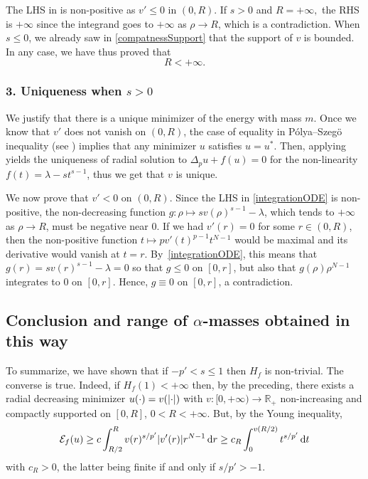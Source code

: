 \documentclass[JEP,XML,SOM,Unicode,published]{cedram}
\theoremstyle{plain}
\theoremstyle{definition}
\newcommand{\dd}{\mathop{}\mathopen{}\mathrm{d}}
\newcommand{\R}{\mathbb{R}}
\newcommand{\ener}{\mathcal{E}}
\DeclarePairedDelimiter{\abs}{\lvert}{\rvert}
\begin{document}
The LHS in  is non-positive as $v'\leq 0$ in $(0,R)$. If $s > 0$ and $R=+\infty,$ the RHS is $+\infty$ since the integrand goes to $+\infty$ as $\rho\to R$, which is a contradiction. When $s\leq 0$, we already saw in \eqref{compatnessSupport} that the support of $v$ is bounded. In any case, we have thus proved that\vspace*{-3pt}
\[
R<+\infty.
\]

\subsubsection*{\textup{3}. Uniqueness when $s>0$} We justify that there is a unique minimizer of the energy with mass $m$. Once we know that $v'$ does not vanish on $(0,R)$, the case of equality in Pólya–Szegö inequality (see \cite[Th.\,1.1]{brothersMinimalRearrangementsSobolev1988}) implies that any minimizer $u$ satisfies $u=u^*$. Then, applying \cite[Th.\,1]{serrinUniquenessGroundStates2000} yields the uniqueness of radial solution to $\Delta_p u+f(u)=0$ for the non-linearity $f(t)=\lambda-st^{s-1}$, thus we get that $v$ is unique.

We now prove that $v'<0$ on $(0,R)$. Since the LHS in \eqref{integrationODE} is non-positive, the non-decreasing function $g:\rho\mapsto sv(\rho)^{s-1}-\lambda$, which tends to $+\infty$ as $\rho\to R$, must be negative near $0$. If we had $v'(r)=0$ for some $r\in(0,R)$, then the non-positive function $t\mapsto pv'(t)^{p-1}t^{N-1}$ would be maximal and its derivative would vanish at $t=r$. By~\eqref{integrationODE}, this means that $g(r)=sv(r)^{s-1}-\lambda=0$ so that $g\leq 0$ on $[0,r]$, but also that $g(\rho)\rho^{N-1}$ integrates to $0$ on $[0,r]$. Hence, $g\equiv 0$ on $[0,r]$, a contradiction.

\subsection*{Conclusion and range of $\alpha$-masses obtained in this way} To summarize, we have shown that if \(-p'<s\leq 1\) then $H_{f}$ is non-trivial. The converse is true. Indeed, if $H_f(1)<+\infty$ then, by the preceding, there exists a radial decreasing minimizer $u(\cdot)=v(\abs{\cdot})$ with $v:[0,+\infty)\to\R_+$ non-increasing and compactly supported on $[0,R]$, $0<R<+\infty$. But, by the Young inequality,
\[
\ener_f(u)\geq c\int_{R/2}^R v(r)^{s/p'}\abs{v'(r)}r^{N-1}\dd r\geq c_R\int_0^{v(R/2)}t^{s/p'}\dd t
\]
with $c_R>0$, the latter being finite if and only if $s/p'>-1$.
\end{document}
